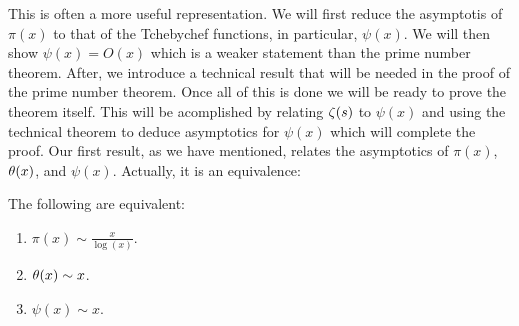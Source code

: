       This is often a more useful representation. We will first reduce the asymptotis of $\pi(x)$ to that of the Tchebychef functions, in particular, $\psi(x)$. We will then show $\psi(x) = O(x)$ which is a weaker statement than the prime number theorem. After, we introduce a technical result that will be needed in the proof of the prime number theorem. Once all of this is done we will be ready to prove the theorem itself. This will be acomplished by relating $\zeta(s)$ to $\psi(x)$ and using the technical theorem to deduce asymptotics for $\psi(x)$ which will complete the proof. Our first result, as we have mentioned, relates the asymptotics of $\pi(x)$, $\theta(x)$, and $\psi(x)$. Actually, it is an equivalence:

      \begin{lemma}\label{lem:prime_number_theorem_equivalence}
        The following are equivalent:
        \begin{enumerate}[label=(\roman*)]
          \item $\pi(x) \sim \frac{x}{\log(x)}$.
          \item $\theta(x) \sim x$.
          \item $\psi(x) \sim x$.
        \end{enumerate}
      \end{lemma}

